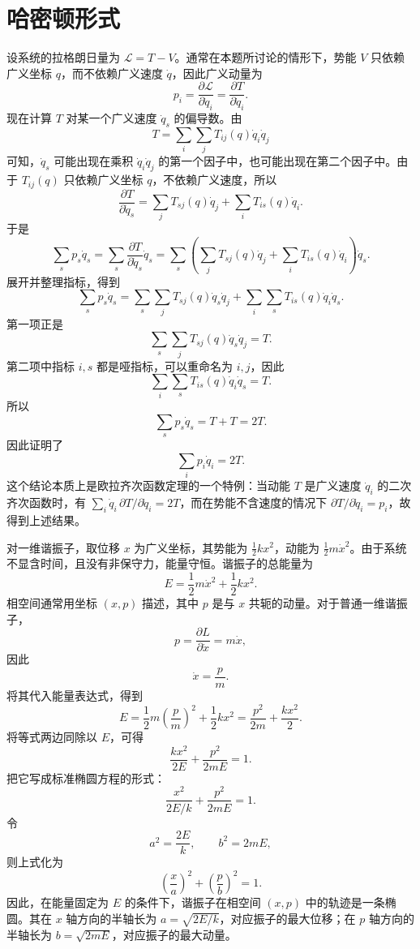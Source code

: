 ﻿%
\section{哈密顿形式}

\begin{solution}[动能]
\answer
设系统的拉格朗日量为 \(\mathcal L=T-V\)。通常在本题所讨论的情形下，势能 \(V\) 只依赖广义坐标 \(q\)，而不依赖广义速度 \(\dot q\)，因此广义动量为
\[
p_i=\frac{\partial \mathcal L}{\partial \dot q_i}=\frac{\partial T}{\partial \dot q_i}.
\]
现在计算 \(T\) 对某一个广义速度 \(\dot q_s\) 的偏导数。由
\[
T=\sum_i\sum_j T_{ij}(q)\dot q_i\dot q_j
\]
可知，\(\dot q_s\) 可能出现在乘积 \(\dot q_i\dot q_j\) 的第一个因子中，也可能出现在第二个因子中。由于 \(T_{ij}(q)\) 只依赖广义坐标 \(q\)，不依赖广义速度，所以
\[
\frac{\partial T}{\partial \dot q_s}
=
\sum_j T_{sj}(q)\dot q_j+\sum_i T_{is}(q)\dot q_i.
\]
于是
\[
\sum_s p_s\dot q_s
=
\sum_s \frac{\partial T}{\partial \dot q_s}\dot q_s
=
\sum_s\left(\sum_j T_{sj}(q)\dot q_j+\sum_i T_{is}(q)\dot q_i\right)\dot q_s.
\]
展开并整理指标，得到
\[
\sum_s p_s\dot q_s
=
\sum_s\sum_j T_{sj}(q)\dot q_s\dot q_j
+
\sum_i\sum_s T_{is}(q)\dot q_i\dot q_s.
\]
第一项正是
\[
\sum_s\sum_j T_{sj}(q)\dot q_s\dot q_j=T.
\]
第二项中指标 \(i,s\) 都是哑指标，可以重命名为 \(i,j\)，因此
\[
\sum_i\sum_s T_{is}(q)\dot q_i\dot q_s=T.
\]
所以
\[
\sum_s p_s\dot q_s=T+T=2T.
\]
因此证明了
\[
\boxed{\sum_i p_i\dot q_i=2T.}
\]
这个结论本质上是欧拉齐次函数定理的一个特例：当动能 \(T\) 是广义速度 \(\dot q_i\) 的二次齐次函数时，有 \(\sum_i \dot q_i\,\partial T/\partial \dot q_i=2T\)，而在势能不含速度的情况下 \(\partial T/\partial \dot q_i=p_i\)，故得到上述结果。
\end{solution}

\begin{solution}[谐振子的相空间轨迹]
\answer
对一维谐振子，取位移 \(x\) 为广义坐标，其势能为 \(\frac{1}{2}kx^2\)，动能为 \(\frac{1}{2}m\dot{x}^2\)。由于系统不显含时间，且没有非保守力，能量守恒。谐振子的总能量为
\[
E=\frac{1}{2}m\dot{x}^{2}+\frac{1}{2}kx^{2}.
\]
相空间通常用坐标 \((x,p)\) 描述，其中 \(p\) 是与 \(x\) 共轭的动量。对于普通一维谐振子，
\[
p=\frac{\partial L}{\partial \dot{x}}=m\dot{x},
\]
因此
\[
\dot{x}=\frac{p}{m}.
\]
将其代入能量表达式，得到
\[
E=\frac{1}{2}m\left(\frac{p}{m}\right)^2+\frac{1}{2}kx^2
=\frac{p^2}{2m}+\frac{kx^2}{2}.
\]
将等式两边同除以 \(E\)，可得
\[
\frac{kx^2}{2E}+\frac{p^2}{2mE}=1.
\]
把它写成标准椭圆方程的形式：
\[
\frac{x^2}{2E/k}+\frac{p^2}{2mE}=1.
\]
令
\[
a^2=\frac{2E}{k},\qquad b^2=2mE,
\]
则上式化为
\[
\left(\frac{x}{a}\right)^2+\left(\frac{p}{b}\right)^2=1.
\]
因此，在能量固定为 \(E\) 的条件下，谐振子在相空间 \((x,p)\) 中的轨迹是一条椭圆。其在 \(x\) 轴方向的半轴长为 \(a=\sqrt{2E/k}\)，对应振子的最大位移；在 \(p\) 轴方向的半轴长为 \(b=\sqrt{2mE}\)，对应振子的最大动量。
\end{solution}


